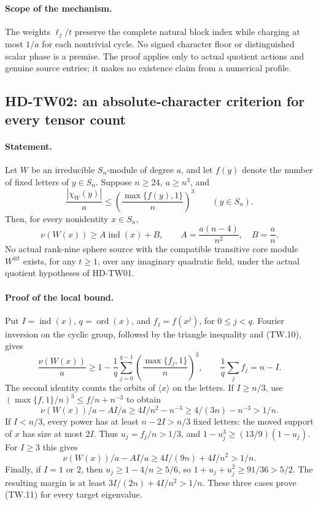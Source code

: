 \paragraph{Scope of the mechanism.}
The weights \(\ell_j/t\) preserve the complete natural block index while
charging at most \(1/a\) for each nontrivial cycle.  No signed character floor
or distinguished scalar phase is a premise.  The proof applies only to
actual quotient actions and genuine source entries; it makes no existence
claim from a numerical profile.

\subsection{HD-TW02: an absolute-character criterion for every tensor count}
\paragraph{Statement.}
Let \(W\) be an irreducible \(S_n\)-module of degree \(a\), and let \(f(y)\)
denote the number of fixed letters of \(y\in S_n\).
Suppose \(n\ge24,\ a\ge n^3\), and
\[
 \frac{|\chi_W(y)|}{a}\le
       \left(\frac{\max\{f(y),1\}}n\right)^3
       \qquad(y\in S_n).
 \tag{TW.10}
\]
Then, for every nonidentity \(x\in S_n\),
\[
 \nu(W(x))\ge A\operatorname{ind}(x)+B,\qquad
 A=\frac{a(n-4)}{n^2},\quad B=\frac an.
 \tag{TW.11}
\]
No actual rank-nine sphere source with the compatible transitive core module
\(W^{\otimes t}\) exists, for any \(t\ge1\), over any imaginary quadratic
field, under the actual quotient hypotheses of HD-TW01.

\paragraph{Proof of the local bound.}
Put \(I=\operatorname{ind}(x)\), \(q=\operatorname{ord}(x)\),
and \(f_j=f(x^j)\), for \(0\le j<q\).
Fourier inversion on the cyclic group, followed by the triangle inequality
and (TW.10), gives
\[
 \frac{\nu(W(x))}{a}\ge
 1-\frac1q\sum_{j=0}^{q-1}
       \left(\frac{\max\{f_j,1\}}n\right)^3,\qquad
 \frac1q\sum_jf_j=n-I .
 \tag{TW.12}
\]
The second identity counts the orbits of \(\langle x\rangle\) on the letters.
If \(I\ge n/3\), use
\((\max\{f,1\}/n)^3\le f/n+n^{-3}\) to obtain
\[
 \nu(W(x))/a-AI/a
 \ge4I/n^2-n^{-3}
 \ge4/(3n)-n^{-3}>1/n.
 \tag{TW.13}
\]
If \(I<n/3\), every power has at least \(n-2I>n/3\) fixed letters:
the moved support of \(x\) has size at most \(2I\).
Thus \(u_j=f_j/n>1/3\), and
\(1-u_j^3\ge(13/9)(1-u_j)\).
For \(I\ge3\) this gives
\[
 \nu(W(x))/a-AI/a
 \ge 4I/(9n)+4I/n^2>1/n.
 \tag{TW.14}
\]
Finally, if \(I=1\) or \(2\), then \(u_j\ge1-4/n\ge5/6\), so
\(1+u_j+u_j^2\ge91/36>5/2\).
The resulting margin is at least
\(3I/(2n)+4I/n^2>1/n\).
These three cases prove (TW.11) for every target eigenvalue.

